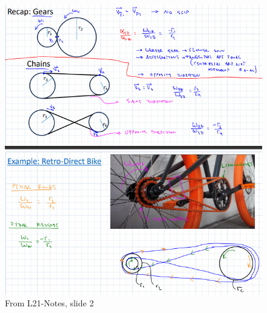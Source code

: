 \begin{figure}[h!]
    \centering
    \includegraphics{RigidBodyKinematics/GearsRecap.png}
    \caption{From L21-Notes, slide 2}
    \label{fig:GearsRecap}
\end{figure}


